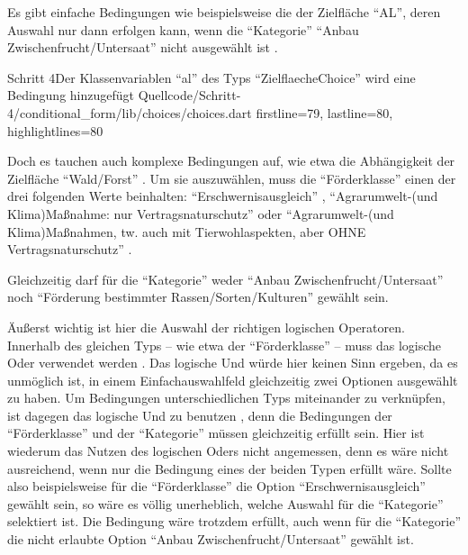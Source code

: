Es gibt einfache Bedingungen wie beispielsweise die der Zielfläche \enquote{AL},
deren Auswahl nur dann erfolgen kann,
wenn die \enquote{Kategorie} \enquote{Anbau Zwischenfrucht/Untersaat} nicht ausgewählt ist \Lst{\ref{lst:Schritt4al}}. 

\begin{alexlisting}{Schritt 4}{Der Klassenvariablen \enquote{al} des Typs \enquote{ZielflaecheChoice} wird eine Bedingung hinzugefügt}
  {Quellcode/Schritt-4/conditional_form/lib/choices/choices.dart}
  {firstline=79, lastline=80, highlightlines={80}}
  \label{lst:Schritt4al}
\end{alexlisting}

Doch es tauchen auch komplexe Bedingungen auf,
wie etwa die Abhängigkeit der Zielfläche \enquote{Wald/Forst} \Lst{\ref{lst:Schritt4wald}}.
Um sie auszuwählen,
muss die \enquote{Förderklasse} einen der drei folgenden Werte beinhalten:
\enquote{Erschwernisausgleich} ,
\enquote{Agrarumwelt-(und Klima)Maßnahme: nur Vertragsnaturschutz}  oder
\enquote{Agrarumwelt-(und Klima)Maßnahmen, tw. auch mit Tierwohlaspekten, aber OHNE Vertragsnaturschutz} .  

Gleichzeitig darf für die \enquote{Kategorie} weder
\enquote{Anbau Zwischenfrucht/Untersaat} 
noch
\enquote{Förderung bestimmter Rassen/Sorten/Kulturen} 
gewählt sein.

Äußerst wichtig ist hier die Auswahl der richtigen logischen Operatoren.
Innerhalb des gleichen Typs -- wie etwa der \enquote{Förderklasse} -- muss das logische Oder \IC{||} verwendet werden .
Das logische Und würde hier keinen Sinn ergeben,
da es unmöglich ist,
in einem Einfachauswahlfeld gleichzeitig zwei Optionen ausgewählt zu haben.
Um Bedingungen unterschiedlichen Typs miteinander zu verknüpfen,
ist dagegen das logische Und \IC{&&} zu benutzen ,
denn die Bedingungen der \enquote{Förderklasse} und der \enquote{Kategorie} müssen gleichzeitig erfüllt sein.
Hier ist wiederum das Nutzen des logischen Oders nicht angemessen,
denn es wäre nicht ausreichend,
wenn nur die Bedingung eines der beiden Typen erfüllt wäre.
Sollte also beispielsweise für die \enquote{Förderklasse} die Option \enquote{Erschwernisausgleich} gewählt sein,
so wäre es völlig unerheblich,
welche Auswahl für die \enquote{Kategorie} selektiert ist.
Die Bedingung wäre trotzdem erfüllt,
auch wenn für die \enquote{Kategorie} die nicht erlaubte Option \enquote{Anbau Zwischenfrucht/Untersaat} gewählt ist.


